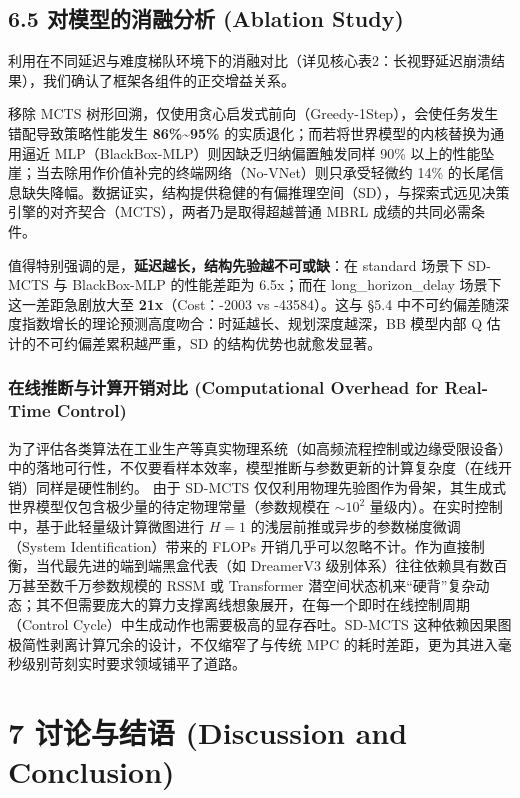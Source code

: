 \documentclass[UTF8]{ctexart}
\begin{document}
\hypertarget{ux5bf9ux6a21ux578bux7684ux6d88ux878dux5206ux6790-ablation-study}{%
\subsection{6.5 对模型的消融分析 (Ablation
Study)}\label{ux5bf9ux6a21ux578bux7684ux6d88ux878dux5206ux6790-ablation-study}}

利用在不同延迟与难度梯队环境下的消融对比（详见核心表2：长视野延迟崩溃结果），我们确认了框架各组件的正交增益关系。

移除 MCTS
树形回溯，仅使用贪心启发式前向（Greedy-1Step），会使任务发生错配导致策略性能发生
\textbf{86\%\textasciitilde{}95\%}
的实质退化；而若将世界模型的内核替换为通用逼近
MLP（BlackBox-MLP）则因缺乏归纳偏置触发同样 90\%
以上的性能坠崖；当去除用作价值补完的终端网络（No-VNet）则只承受轻微约
14\%
的长尾信息缺失降幅。数据证实，结构提供稳健的有偏推理空间（SD），与探索式远见决策引擎的对齐契合（MCTS），两者乃是取得超越普通
MBRL 成绩的共同必需条件。

值得特别强调的是，\textbf{延迟越长，结构先验越不可或缺}：在 standard
场景下 SD-MCTS 与 BlackBox-MLP 的性能差距为 6.5x；而在
long\_horizon\_delay 场景下这一差距急剧放大至 \textbf{21x}（Cost：-2003
vs -43584）。这与 §5.4
中不可约偏差随深度指数增长的理论预测高度吻合：时延越长、规划深度越深，BB
模型内部 Q 估计的不可约偏差累积越严重，SD 的结构优势也就愈发显著。

\subsubsection{在线推断与计算开销对比 (Computational Overhead for Real-Time Control)}

为了评估各类算法在工业生产等真实物理系统（如高频流程控制或边缘受限设备）中的落地可行性，不仅要看样本效率，模型推断与参数更新的计算复杂度（在线开销）同样是硬性制约。
由于 SD-MCTS 仅仅利用物理先验图作为骨架，其生成式世界模型仅包含极少量的待定物理常量（参数规模在 \(\sim 10^2\) 量级内）。在实时控制中，基于此轻量级计算微图进行 \(H=1\) 的浅层前推或异步的参数梯度微调（System Identification）带来的 FLOPs 开销几乎可以忽略不计。作为直接制衡，当代最先进的端到端黑盒代表（如 DreamerV3 级别体系）往往依赖具有数百万甚至数千万参数规模的 RSSM 或 Transformer 潜空间状态机来“硬背”复杂动态；其不但需要庞大的算力支撑离线想象展开，在每一个即时在线控制周期（Control Cycle）中生成动作也需要极高的显存吞吐。SD-MCTS 这种依赖因果图极简性剥离计算冗余的设计，不仅缩窄了与传统 MPC 的耗时差距，更为其进入毫秒级别苛刻实时要求领域铺平了道路。

\hypertarget{ux8ba8ux8bbaux4e0eux7ed3ux8bed-discussion-and-conclusion}{%
\section{7 讨论与结语 (Discussion and
Conclusion)}\label{ux8ba8ux8bbaux4e0eux7ed3ux8bed-discussion-and-conclusion}}
\end{document}
